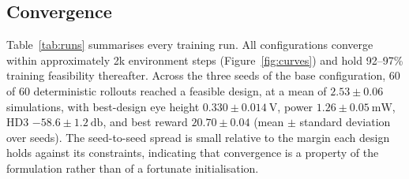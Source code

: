\documentclass[10pt,a4paper]{article}
\begin{document}
\subsection{Convergence}

Table~\ref{tab:runs} summarises every training run. All configurations converge
within approximately 2k environment steps (Figure~\ref{fig:curves}) and hold
92--97\% training feasibility thereafter. Across the three seeds of the base
configuration, 60 of 60 deterministic rollouts reached a feasible design, at a
mean of $2.53\pm0.06$ simulations, with best-design eye height
$0.330\pm\SI{0.014}{\volt}$, power $1.26\pm\SI{0.05}{\milli\watt}$, HD3
$-58.6\pm\SI{1.2}{\decibel}$, and best reward $20.70\pm0.04$ (mean $\pm$ standard
deviation over seeds). The seed-to-seed spread is small relative to the margin
each design holds against its constraints, indicating that convergence is a
property of the formulation rather than of a fortunate initialisation.
\end{document}

